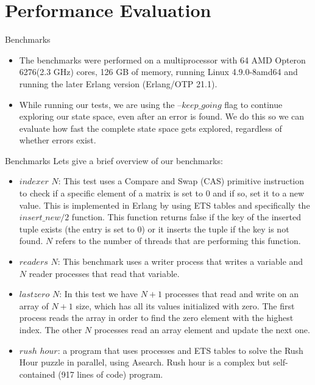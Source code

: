 \documentclass[9pt]{beamer}
\begin{document}
\section{Performance Evaluation}



\begin{frame}{Benchmarks}

\begin{itemize}
\item The benchmarks were performed on a multiprocessor with 64 AMD Opteron 6276(2.3 GHz) cores, 126 GB of memory, running
Linux 4.9.0-8amd64 and running the later Erlang version (Erlang/OTP 21.1). 
\item While running our tests, we are using the
--$keep\_going$ flag to continue exploring our state space, even after an error is found. We do this so we can evaluate
how fast the complete state space gets explored, regardless of whether errors exist.
\end{itemize}

\end{frame}


\begin{frame} {Benchmarks}
Lets give a brief overview of our benchmarks:

\begin{itemize}
    \item $indexer$ $N$: This test uses a Compare and Swap (CAS) primitive instruction to check if a specific element of
    a matrix is set to 0 and if so, set it to a new value. This is implemented in Erlang by using ETS tables and specifically
    the $insert\_new/2$ function. This function returns false if the key of the inserted tuple exists (the entry is set to 0)
    or it inserts the tuple if the key is not found. $N$ refers to the number of threads that are performing this function.
    \item $readers$ $N$: This benchmark uses a writer process that writes a variable and $N$ reader processes that read that variable.
    \item $lastzero$ $N$: In this test we have $N+1$ processes that read and write on an array of $N+1$ size, which has all its 
    values initialized with zero. The first process reads the array in order to find the zero element with the highest
    index. The other $N$ processes read an array element and update the next one.
    \item $rush$ $hour$: a program that uses processes and
    ETS tables to solve the Rush Hour puzzle in parallel, using A\textasteriskcentered  search. Rush hour is a complex but self-contained (917 lines of code) program.
\end{itemize}

\end{frame}
\end{document}
